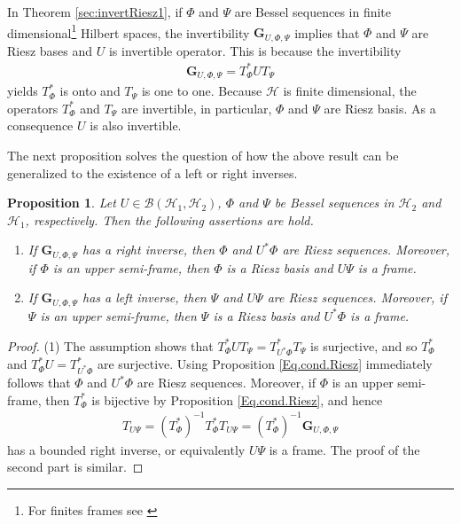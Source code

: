 \documentclass{birkjour}
\newtheorem{prop}[thm]{Proposition}
\theoremstyle{definition}
\theoremstyle{remark}
\numberwithin{equation}{section}
\def\Hil{\mathcal{H}}
\newcommand{\BL}[1]{
{\mathcal B} \left( #1 \right)
}
\begin{document}
In Theorem \ref{sec:invertRiesz1}, if $\Phi$ and $\Psi$ are Bessel sequences in   finite dimensional\footnote{For finites frames see \cite{xxlfinfram1,caku13}
} Hilbert spaces,
the invertibility
$\mathbf{G}_{U,\Phi,\Psi}$ implies that $\Phi$ and $\Psi$
are Riesz bases and $U$ is invertible operator.
This is because
the invertibility
\begin{eqnarray*}
\mathbf{G}_{U,\Phi,\Psi}=T_{\Phi}^{*}UT_{\Psi}
\end{eqnarray*}
yields $T_{\Phi}^{*}$ is onto and $T_{\Psi}$ is one to one.
Because $\mathcal{H}$ is finite dimensional,  the operators  $T_{\Phi}^{*}$ and
$T_{\Psi}$ are invertible, in particular, $\Phi$ and $\Psi$ are Riesz basis. As a consequence $U$ is also invertible.

The next proposition solves the question of how the above result can be generalized to the existence of a left or right inverses.

\begin{prop}
Let $U\in \BL{ \Hil_1,\Hil_2}$, $\Phi$ and $\Psi$ be Bessel sequences in $\mathcal{H}_2$ and $\Hil_1$, respectively. Then the following assertions are hold.
\begin{enumerate}
\item[(1)]  If $\mathbf{G}_{U,\Phi,\Psi}$ has a right inverse, then $\Phi$ and $U^*\Phi$ are  Riesz sequences. Moreover, if $\Phi$ is  an upper semi-frame, then $\Phi$ is a Riesz basis and $U\Psi$ is a frame.

\item[(2)]  If
$\mathbf{G}_{U,\Phi,\Psi}$ has a left inverse, then $\Psi$ and
$U\Psi$ are  Riesz sequences. Moreover, if $\Psi$ is an upper semi-frame, then
$\Psi$ is a Riesz basis and $U^*\Phi$ is a frame.
\end{enumerate}
\end{prop}
\begin{proof}
(1) The assumption shows that $T_{\Phi}^*U T_{\Psi}=T_{U^*\Phi}^* T_{\Psi}$ is surjective, and so $T_\Phi^*$  and $T_{\Phi}^*U=T_{U^*\Phi}^*$ are surjective.
Using Proposition \ref{Eq.cond.Riesz} immediately follows that $\Phi$ and $U^*\Phi$ are Riesz sequences.
Moreover, if $\Phi$ is an upper semi-frame, then $T_{\Phi}^*$ is bijective by Proposition \ref{Eq.cond.Riesz}, and hence
\begin{eqnarray*}
T_{U\Psi}=\left(T_{\Phi}^*\right)^{-1}T_{\Phi}^*T_{U\Psi}=\left(T_{\Phi}^*\right)^{-1}\mathbf{G}_{U,\Phi,\Psi} 
\end{eqnarray*}
has a  bounded right inverse, or equivalently $U\Psi$ is a frame. The proof of the second part is similar.
\end{proof}
\end{document}
